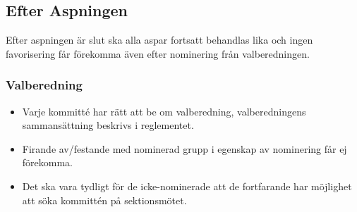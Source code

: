 \documentclass[a4paper]{dtek}
\begin{document}
\subsection{Efter Aspningen}
Efter aspningen är slut ska alla aspar fortsatt behandlas lika och ingen favorisering får förekomma även efter nominering från valberedningen. 
\subsubsection{Valberedning}
\begin{itemize}
    \item Varje kommitté har rätt att be om valberedning, valberedningens sammansättning beskrivs i reglementet. 
    \item Firande av/festande med nominerad grupp i egenskap av nominering får ej förekomma. 
    \item Det ska vara tydligt för de icke-nominerade att de fortfarande har möjlighet att söka kommittén på sektionsmötet. 
\end{itemize}
\end{document}
